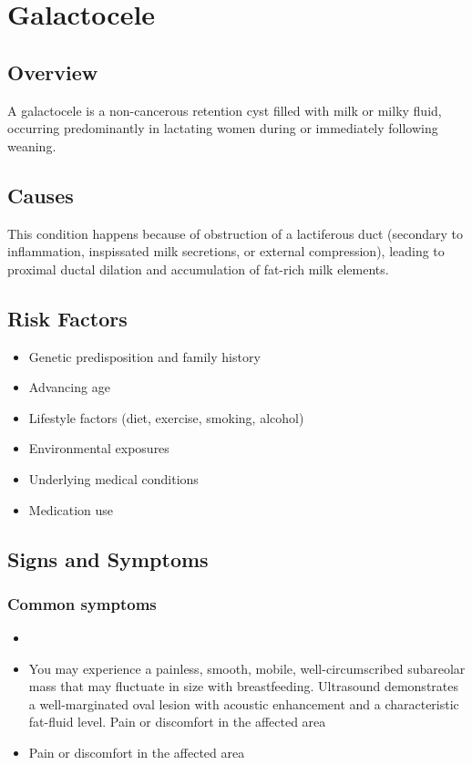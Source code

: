 \chapter{Galactocele}
\label{sec:Galactocele}

\section{Overview}
A galactocele is a non-cancerous retention cyst filled with milk or milky fluid, occurring predominantly in lactating women during or immediately following weaning.
\section{Causes}
This condition happens because of obstruction of a lactiferous duct (secondary to inflammation, inspissated milk secretions, or external compression), leading to proximal ductal dilation and accumulation of fat-rich milk elements.     
\section{Risk Factors}

\begin{itemize}[noitemsep]
  \item Genetic predisposition and family history
  \item Advancing age
  \item Lifestyle factors (diet, exercise, smoking, alcohol)
  \item Environmental exposures
  \item Underlying medical conditions
  \item Medication use
\end{itemize}
\section{Signs and Symptoms}

\subsection{Common symptoms}
\begin{itemize}[noitemsep]
  \item \item You may experience a painless, smooth, mobile, well-circumscribed subareolar mass that may fluctuate in size with breastfeeding. Ultrasound demonstrates a well-marginated oval lesion with acoustic enhancement and a characteristic fat-fluid level. Pain or discomfort in the affected area    \item Pain or discomfort in the affected area
  \end{itemize}

